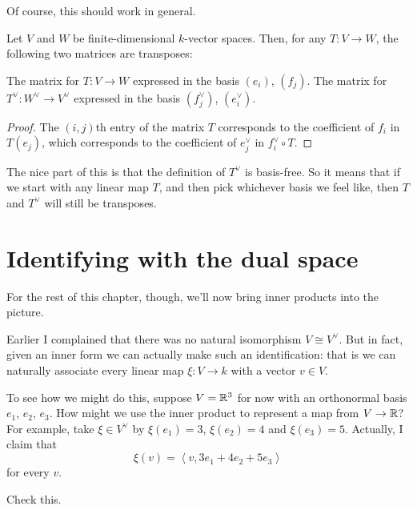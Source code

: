 Of course, this should work in general.
\begin{theorem}
	Let $V$ and $W$ be finite-dimensional $k$-vector spaces.
	Then, for any $T \colon V \to W$,
	the following two matrices are transposes:
	\begin{itemize}
		\ii The matrix for $T \colon V \to W$
		expressed in the basis $(e_i)$, $(f_j)$.
		\ii The matrix for $T^\vee \colon W^\vee \to V^\vee$
		expressed in the basis $(f_j^\vee)$, $(e_i^\vee)$.
	\end{itemize}
\end{theorem}
\begin{proof}
	The $(i,j)$th entry of the matrix $T$
	corresponds to the coefficient of $f_i$ in $T(e_j)$,
	which corresponds to the coefficient of $e_j^\vee$
	in $f_i^\vee \circ T$.
\end{proof}
The nice part of this is that the definition of $T^\vee$ is basis-free.
So it means that if we start with any linear map $T$,
and then pick whichever basis we feel like,
then $T$ and $T^\vee$ will still be transposes.

\section{Identifying with the dual space}
For the rest of this chapter, though,
we'll now bring inner products into the picture.

Earlier I complained that there was no natural isomorphism $V \cong V^\vee$.
But in fact, given an inner form
we can actually make such an identification:
that is we can naturally associate every linear map
$\xi \colon V \to k$ with a vector $v \in V$.

To see how we might do this, suppose $V = \mathbb R^3$
for now with an orthonormal basis $e_1$, $e_2$, $e_3$.
How might we use the inner product to
represent a map from $V \to \mathbb R$?
For example, take $\xi \in V^\vee$ by
$\xi(e_1) = 3$, $\xi(e_2) = 4$ and $\xi(e_3) = 5$.
Actually, I claim that
\[ \xi(v) = \left< v, 3e_1 + 4e_2 + 5e_3 \right> \]
for every $v$.
\begin{ques}
	Check this.
\end{ques}

